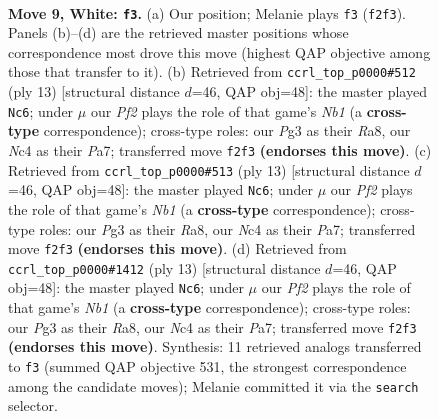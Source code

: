 \documentclass[11pt]{article}
\begin{document}
\clearpage

\begin{figure}[p]\centering
\begin{subfigure}{0.46\textwidth}\centering
\resizebox{\linewidth}{!}{%
\newchessgame
\chessboard[
  setfen={r1bq1rk1/pp2bppp/n1p1pn2/8/2NP4/6P1/PP2PPBP/RNBQ1RK1 w - - 1 9},
  showmover=false,
  pgfstyle=straightmove, color=movearrow, markmove={f2-f3}
]}
\caption{}
\end{subfigure}\hfill
\begin{subfigure}{0.46\textwidth}\centering
\resizebox{\linewidth}{!}{%
\newchessgame
\chessboard[
  setfen={rnbq1rk1/ppp1ppbp/5np1/8/2pP4/N4NP1/PP2PPBP/R1BQ1RK1 b - - 1 7},
  showmover=false,
  pgfstyle=straightmove, color=movearrow, markmove={b8-c6}
]}
\caption{}
\end{subfigure}
\\[4pt]
\begin{subfigure}{0.46\textwidth}\centering
\resizebox{\linewidth}{!}{%
\newchessgame
\chessboard[
  setfen={rnbq1rk1/ppp1ppbp/5np1/8/2pP4/N4NP1/PP2PPBP/R1BQ1RK1 b - - 1 7},
  showmover=false,
  pgfstyle=straightmove, color=movearrow, markmove={b8-c6}
]}
\caption{}
\end{subfigure}\hfill
\begin{subfigure}{0.46\textwidth}\centering
\resizebox{\linewidth}{!}{%
\newchessgame
\chessboard[
  setfen={rnbq1rk1/ppp1ppbp/5np1/8/2pP4/N4NP1/PP2PPBP/R1BQ1RK1 b - - 1 7},
  showmover=false,
  pgfstyle=straightmove, color=movearrow, markmove={b8-c6}
]}
\caption{}
\end{subfigure}
\caption{\textbf{Move 9, White: \texttt{f3}.} (a) Our position; Melanie plays \texttt{f3} (\texttt{f2f3}). Panels (b)--(d) are the retrieved master positions whose correspondence most drove this move (highest QAP objective among those that transfer to it). (b) Retrieved from \texttt{ccrl\_top\_p0000\#512} (ply 13) [structural distance $d$=46, QAP obj=48]: the master played \texttt{Nc6}; under $\mu$ our \emph{Pf2} plays the role of that game's \emph{Nb1} (a \textbf{cross-type} correspondence); cross-type roles: our \emph{P}g3 as their \emph{R}a8, our \emph{N}c4 as their \emph{P}a7; transferred move \texttt{f2f3} \textbf{(endorses this move)}. (c) Retrieved from \texttt{ccrl\_top\_p0000\#513} (ply 13) [structural distance $d$=46, QAP obj=48]: the master played \texttt{Nc6}; under $\mu$ our \emph{Pf2} plays the role of that game's \emph{Nb1} (a \textbf{cross-type} correspondence); cross-type roles: our \emph{P}g3 as their \emph{R}a8, our \emph{N}c4 as their \emph{P}a7; transferred move \texttt{f2f3} \textbf{(endorses this move)}. (d) Retrieved from \texttt{ccrl\_top\_p0000\#1412} (ply 13) [structural distance $d$=46, QAP obj=48]: the master played \texttt{Nc6}; under $\mu$ our \emph{Pf2} plays the role of that game's \emph{Nb1} (a \textbf{cross-type} correspondence); cross-type roles: our \emph{P}g3 as their \emph{R}a8, our \emph{N}c4 as their \emph{P}a7; transferred move \texttt{f2f3} \textbf{(endorses this move)}. Synthesis: 11 retrieved analogs transferred to \texttt{f3} (summed QAP objective 531, the strongest correspondence among the candidate moves); Melanie committed it via the \texttt{search} selector.}
\label{fig:thought-m16}
\end{figure}
\end{document}
